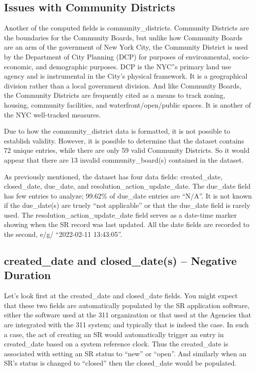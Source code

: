 \documentclass[12pt, titlepage]{article}
\begin{document}
\subsection{Issues with Community Districts}
\label{sec:communitydistrict}
	Another of the computed fields is community\_districts. Community Districts 
	are the boundaries for the Community Boards, but unlike how 
	Community Boards are an arm of the government of New York City, 
	the Community District is used by the Department of City Planning 
	(DCP) for purposes of environmental, socio-economic, and demographic 
	purposes. DCP is the NYC''s primary land use agency and is 
	instrumental in the City's physical framework.  It is a geographical 
	division rather than a local government division. And like Community 
	Boards, the Community Districts are frequently cited as a means to 
	track zoning, housing, community facilities, and waterfront/open/public spaces. 
	It is another of the NYC well-tracked measures.

	Due to how the community\_district data is formatted, it is not possible 
	to establish validity. However, it is possible to determine that the 
	dataset contains 72 unique entries, while there are only 59 valid Community 
	Districts. So it would appear that there are 13 invalid 
	community\_board(s) contained in the dataset.
	
	As previously mentioned, the dataset has four data fields:  created\_date, 
	closed\_date, due\_date, and resolution\_action\_update\_date. 
	The due\_date field has few entries to analyze; 99.62\% of due\_date entries 
	are ``N/A''.  It is not known if the due\_date(s) are truely ``not applicable'' 
	or that the due\_date field is rarely used. The  resolution\_action\_update\_date 
	field serves as a date-time marker showing when the SR record was last updated.  
	All the date fields are recorded to the second, e/g/ ``2022-02-11 13:43:05''.

\subsection{created\_date and closed\_date(s) -- Negative Duration}
\label{sec:negativeduration}
	Let's look first at the created\_date and closed\_date fields. You might 
	expect that these two fields are automatically populated by the 
	SR application software, either the software used at the 311 organization 
	or that used at the Agencies that are integrated with the 311 system; 
	and typically that is indeed the case. In such a case, the act of creating an 
	SR would automatically trigger an entry in created\_date based on a 
	system reference clock. Thus the created\_date is associated with 
	setting an SR status to ``new'' or ``open''. And similarly when an SR's 
	status is changed to ``closed'' then the closed\_date would be populated. 
	
\end{document}
